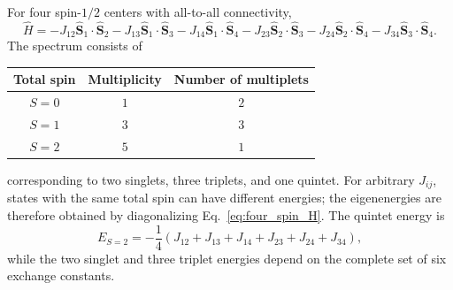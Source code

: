 For four spin-$1/2$ centers with all-to-all connectivity,
\begin{equation}
    \hat H =
      -J_{12}\hat{\mathbf S}_1\cdot\hat{\mathbf S}_2
      -J_{13}\hat{\mathbf S}_1\cdot\hat{\mathbf S}_3
      -J_{14}\hat{\mathbf S}_1\cdot\hat{\mathbf S}_4
      -J_{23}\hat{\mathbf S}_2\cdot\hat{\mathbf S}_3
      -J_{24}\hat{\mathbf S}_2\cdot\hat{\mathbf S}_4
      -J_{34}\hat{\mathbf S}_3\cdot\hat{\mathbf S}_4.
    \label{eq:four_spin_H}
\end{equation}
\noindent The spectrum consists of
\begin{center}
\begin{tabular}{ccc}
\hline
Total spin & Multiplicity & Number of multiplets\\
\hline
$S=0$ & $1$ & $2$\\
$S=1$ & $3$ & $3$\\
$S=2$ & $5$ & $1$\\
\hline
\end{tabular}
\end{center}
corresponding to two singlets, three triplets, and one quintet.
For arbitrary $J_{ij}$, states with the same total spin can have
different energies; the eigenenergies are therefore obtained by
diagonalizing Eq.~\eqref{eq:four_spin_H}. The quintet energy is
\begin{equation}
    E_{S=2}
    =
    -\frac14
    \left(
    J_{12}+J_{13}+J_{14}+J_{23}+J_{24}+J_{34}
    \right),
\end{equation}
while the two singlet and three triplet energies depend on the complete
set of six exchange constants.

